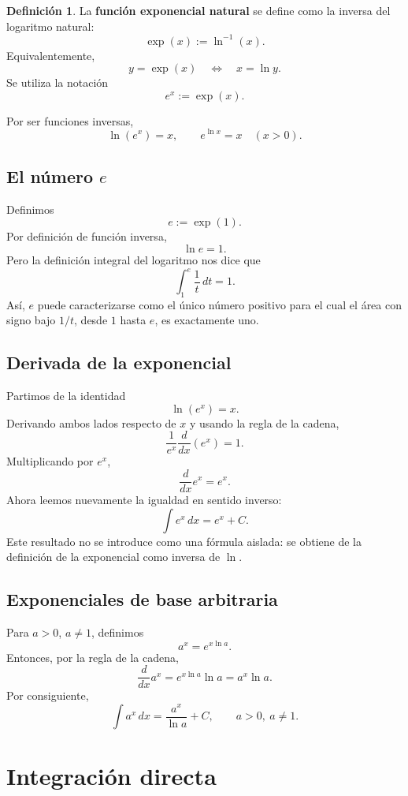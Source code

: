 \documentclass[12pt]{article}
\theoremstyle{definition}
\newtheorem{definicion}[teorema]{Definición}
\theoremstyle{remark}
\begin{document}
\begin{definicion}
La \textbf{función exponencial natural} se define como la inversa del logaritmo natural:
\[
\boxed{\exp(x):=\ln^{-1}(x).}
\]
Equivalentemente,
\[
y=\exp(x)\quad\Longleftrightarrow\quad x=\ln y.
\]
Se utiliza la notación
\[
\boxed{e^x:=\exp(x).}
\]
\end{definicion}
Por ser funciones inversas,
\[
\boxed{\ln(e^x)=x,\qquad e^{\ln x}=x\quad(x>0).}
\]

\subsection*{El número $e$}
Definimos
\[
\boxed{e:=\exp(1).}
\]
Por definición de función inversa,
\[
\ln e=1.
\]
Pero la definición integral del logaritmo nos dice que
\[
\boxed{\int_1^e\frac{1}{t}\,dt=1.}
\]
Así, $e$ puede caracterizarse como el único número positivo para el cual el área con signo bajo $1/t$, desde $1$ hasta $e$, es exactamente uno.
\subsection*{Derivada de la exponencial}
Partimos de la identidad
\[
\ln(e^x)=x.
\]
Derivando ambos lados respecto de $x$ y usando la regla de la cadena,
\[
\frac{1}{e^x}\frac{d}{dx}(e^x)=1.
\]
Multiplicando por $e^x$,
\[
\boxed{\frac{d}{dx}e^x=e^x.}
\]
Ahora leemos nuevamente la igualdad en sentido inverso:
\[
\boxed{\int e^x\,dx=e^x+C.}
\]
Este resultado no se introduce como una fórmula aislada: se obtiene de la definición de la exponencial como inversa de $\ln$.
\subsection*{Exponenciales de base arbitraria}
Para $a>0$, $a\neq1$, definimos
\[
a^x=e^{x\ln a}.
\]
Entonces, por la regla de la cadena,
\[
\frac{d}{dx}a^x=e^{x\ln a}\ln a=a^x\ln a.
\]
Por consiguiente,
\[
\boxed{\int a^x\,dx=\frac{a^x}{\ln a}+C,\qquad a>0,\ a\neq1.}
\]

\section{Integración directa}
\end{document}
